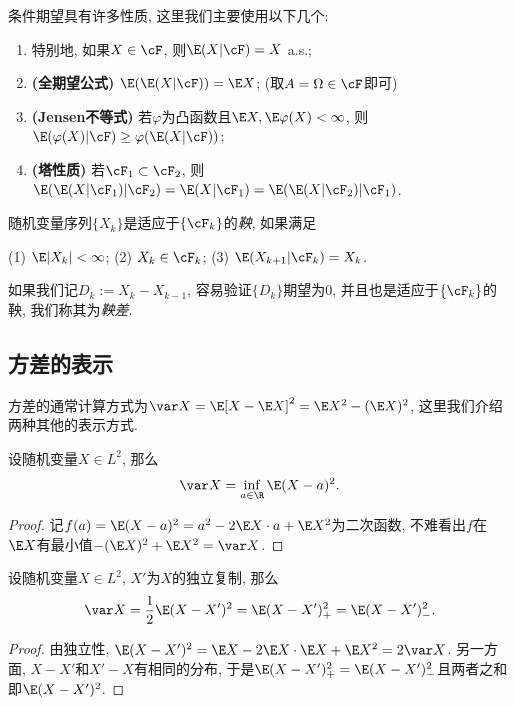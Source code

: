 条件期望具有许多性质, 这里我们主要使用以下几个: 
	\begin{enumerate}[label=(\roman*)]
		\item 特别地, 如果$X \in \cF$, 则$\E(X|\cF) = X$ a.s.;
		\item \textbf{(全期望公式)} $\E(\E(X|\cF)) = \E X$; (取$A = \Omega \in \cF$即可)
		\item \textbf{(Jensen不等式)} 若$\varphi$为凸函数且$\E X, \E \varphi(X) < \infty$, 则$\E(\varphi(X) | \cF) \geq \varphi(\E(X|\cF))$; 
		\item \textbf{(塔性质)} 若$\cF_1 \subset \cF_2$, 则$\E(\E(X|\cF_1)|\cF_2) = \E(X|\cF_1) = \E(\E(X|\cF_2)|\cF_1)$. 
	\end{enumerate}
随机变量序列$\{X_k\}$是适应于$\{\cF_k\}$的\emph{鞅}, 如果满足
\begin{center}
	(1) $\E |X_k| < \infty$; \quad
	(2) $X_k \in \cF_k$; \quad
	(3) $\E(X_{k+1}|\cF_k) = X_k$.
\end{center}
如果我们记$D_k := X_k - X_{k-1}$, 容易验证$\{D_k\}$期望为$0$, 并且也是适应于$\{\cF_k\}$的鞅, 我们称其为\emph{鞅差}. 

\subsection{方差的表示}

方差的通常计算方式为$\var X = \E[X - \E X]^2 = \E X^2 - (\E X)^2$, 这里我们介绍两种其他的表示方式. 

\begin{lemma}[方差的变分表示]
	设随机变量$X \in L^2$, 那么
	\begin{equation*}
		\var X = \inf_{a \in \R} \E (X - a)^2. 
	\end{equation*}
\end{lemma}
\begin{proof}
	记$f(a) =  \E (X - a)^2 = a^2 - 2 \E X \cdot a + \E X^2$为二次函数, 不难看出$f$在$\E X$有最小值$- (\E X)^2 + \E X^2 = \var X$. 
\end{proof}

\begin{lemma}[独立复制]
	设随机变量$X \in L^2$, $X'$为$X$的独立复制, 那么
	\begin{equation*}
		\var X = \frac12 \E (X - X')^2
		= \E (X - X')_+^2 = \E (X - X')_-^2. 
	\end{equation*}
\end{lemma}
\begin{proof}
	由独立性, $\E (X - X')^2 = \E X - 2 \E X \cdot \E X + \E X^2 = 2 \var X$. 
	另一方面, $X - X'$和$X' - X$有相同的分布, 于是$\E(X - X')_+^2 = \E(X - X')_-^2$且两者之和即$\E (X - X')^2$. 
\end{proof}

